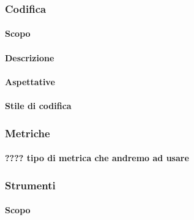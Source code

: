 \subsubsection{Codifica}
\paragraph{Scopo}
\paragraph{Descrizione}
\paragraph{Aspettative}
\paragraph{Stile di codifica}

\subsubsection{Metriche}
\paragraph{???? tipo di metrica che andremo ad usare}

\subsubsection{Strumenti}
\paragraph{Scopo}









